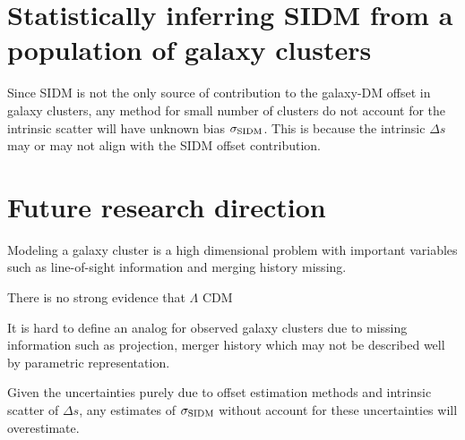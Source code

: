 \section{Statistically inferring SIDM from a population of galaxy clusters} 
Since SIDM is not the only source of contribution to the galaxy-DM offset 
in galaxy clusters,
any method for small number of clusters do not account for the intrinsic 
scatter will have unknown bias $\sigma_{\rm SIDM}$. 
This is because the intrinsic $\Delta s$ may or may 
not align with the SIDM offset contribution. 





% 
% 
% 
% 
% 

\section{Future research direction}
Modeling a galaxy cluster is a high dimensional problem with important
variables such as line-of-sight information and merging history missing.


There is no strong evidence that $\Lambda$ CDM  

It is hard to define an analog for observed galaxy clusters due to missing
information such as projection, merger history which may not be described well
by parametric representation.

Given the uncertainties purely due to offset estimation methods and 
intrinsic scatter of $\Delta s$, any estimates of $\sigma_{\rm SIDM}$ without
account for these uncertainties will overestimate. 

